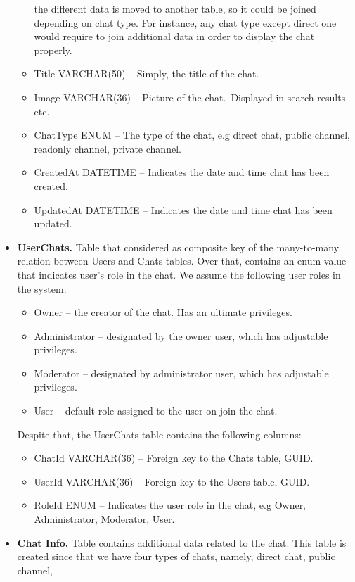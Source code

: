 \begin{itemize}
\begin{itemize}
        the different data is moved to another table, so it could be joined depending on chat type.
        For instance, any chat type except direct one would require to join additional data in order to display the chat properly.
        \item Title VARCHAR(50) -- Simply, the title of the chat.
        \item Image VARCHAR(36) -- Picture of the chat.\ Displayed in search results etc.
        \item ChatType ENUM -- The type of the chat, e.g direct chat, public channel, readonly channel, private channel.
        \item CreatedAt DATETIME -- Indicates the date and time chat has been created.
        \item UpdatedAt DATETIME -- Indicates the date and time chat has been updated.
    \end{itemize}
    \item \textbf{UserChats.} Table that considered as composite key of the many-to-many relation between Users and Chats tables.
    Over that, contains an enum value that indicates user's role in the chat.
    We assume the following user roles in the system:
    \begin{itemize}
        \item Owner -- the creator of the chat.
        Has an ultimate privileges.
        \item Administrator -- designated by the owner user, which has adjustable privileges.
        \item Moderator -- designated by administrator user, which has adjustable privileges.
        \item User -- default role assigned to the user on join the chat.
    \end{itemize}
    Despite that, the UserChats table contains the following columns:
    \begin{itemize}
        \item ChatId VARCHAR(36) -- Foreign key to the Chats table, GUID\@.
        \item UserId VARCHAR(36) -- Foreign key to the Users table, GUID\@.
        \item RoleId ENUM -- Indicates the user role in the chat, e.g Owner, Administrator, Moderator, User.
    \end{itemize}
    \item \textbf{Chat Info.} Table contains additional data related to the chat.
    This table is created since that we have four types of chats, namely, direct chat, public channel,

\end{itemize}
